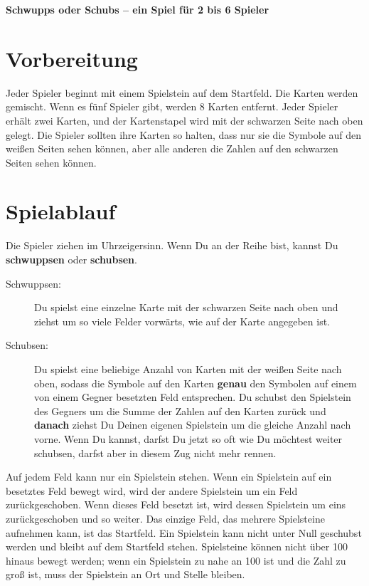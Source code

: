 \documentclass{article}
\begin{document}
{\center\LARGE\textbf{Schwupps oder Schubs -- ein Spiel für 2 bis 6 Spieler}}

\section*{Vorbereitung}

Jeder Spieler beginnt mit einem Spielstein auf dem Startfeld. Die Karten werden gemischt. Wenn es fünf Spieler gibt, werden 8 Karten entfernt. Jeder Spieler erhält zwei Karten, und der Kartenstapel wird mit der schwarzen Seite nach oben gelegt. Die Spieler sollten ihre Karten so halten, dass nur sie die Symbole auf den weißen Seiten sehen können, aber alle anderen die Zahlen auf den schwarzen Seiten sehen können.

\section*{Spielablauf}

Die Spieler ziehen im Uhrzeigersinn. Wenn Du an der Reihe bist, kannst Du \textbf{schwuppsen} oder \textbf{schubsen}.

\begin{description}

\item[Schwuppsen:] 

Du spielst eine einzelne Karte mit der schwarzen Seite nach oben und ziehst um so viele Felder vorwärts, wie auf der Karte angegeben ist.

\item[Schubsen:]

Du spielst eine beliebige Anzahl von Karten mit der weißen Seite nach oben, sodass die Symbole auf den Karten \textbf{genau} den Symbolen auf einem von einem Gegner besetzten Feld entsprechen. Du schubst den Spielstein des Gegners um die Summe der Zahlen auf den Karten zurück und \textbf{danach} ziehst Du Deinen eigenen Spielstein um die gleiche Anzahl nach vorne. Wenn Du kannst, darfst Du jetzt so oft wie Du möchtest weiter schubsen, darfst aber in diesem Zug nicht mehr rennen.

\end{description}

Auf jedem Feld kann nur ein Spielstein stehen. Wenn ein Spielstein auf ein besetztes Feld bewegt wird, wird der andere Spielstein um ein Feld zurückgeschoben. Wenn dieses Feld besetzt ist, wird dessen Spielstein um eins zurückgeschoben und so weiter. Das einzige Feld, das mehrere Spielsteine aufnehmen kann, ist das Startfeld. Ein Spielstein kann nicht unter Null geschubst werden und bleibt auf dem Startfeld stehen. Spielsteine können nicht über 100 hinaus bewegt werden; wenn ein Spielstein zu nahe an 100 ist und die Zahl zu groß ist, muss der Spielstein an Ort und Stelle bleiben.
\end{document}
